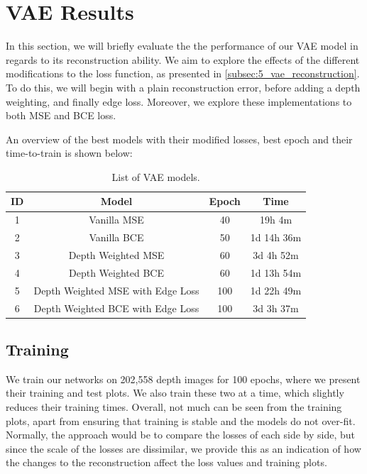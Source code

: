 \chapter{VAE Results}
\label{chap:8_vae_evaluation_studies}
In this section, we will briefly evaluate the the performance of our VAE model in regards to its reconstruction ability. We aim to explore the effects of the different modifications to the loss function, as presented in \cref{subsec:5_vae_reconstruction}. To do this, we will begin with a plain reconstruction error, before adding a depth weighting, and finally edge loss.
Moreover, we explore these implementations to both MSE and BCE loss.

An overview of the best models with their modified losses, best epoch and their time-to-train is shown below:
\begin{table}[hbt]
    \centering
    \begin{tabular}{||c|c|c|c||}
    \hline
        ID & Model & Epoch & Time \\
    \hline\hline
        1 & Vanilla MSE & 40 & 19h 4m \\\hline
        2 & Vanilla BCE & 50 & 1d 14h 36m \\\hline
        3 & Depth Weighted MSE & 60 & 3d 4h 52m \\\hline
        4 & Depth Weighted BCE & 60 &  1d 13h 54m \\\hline
        5 & Depth Weighted MSE with Edge Loss & 100 & 1d 22h 49m \\\hline
        6 & Depth Weighted BCE with Edge Loss & 100 & 3d 3h 37m \\
    \hline
    \end{tabular}
    \caption{List of VAE models.}
    \label{tab:8_all_vae_models}
\end{table}


\section{Training}
\label{sec:8_training}
We train our networks on 202,558 depth images for 100 epochs, where we present their training and test plots. We also train these two at a time, which slightly reduces their training times. 
Overall, not much can be seen from the training plots, apart from ensuring that training is stable and the models do not over-fit. Normally, the approach would be to compare the losses of each side by side, but since the scale of the losses are dissimilar, we provide this as an indication of how the changes to the reconstruction affect the loss values and training plots. 



